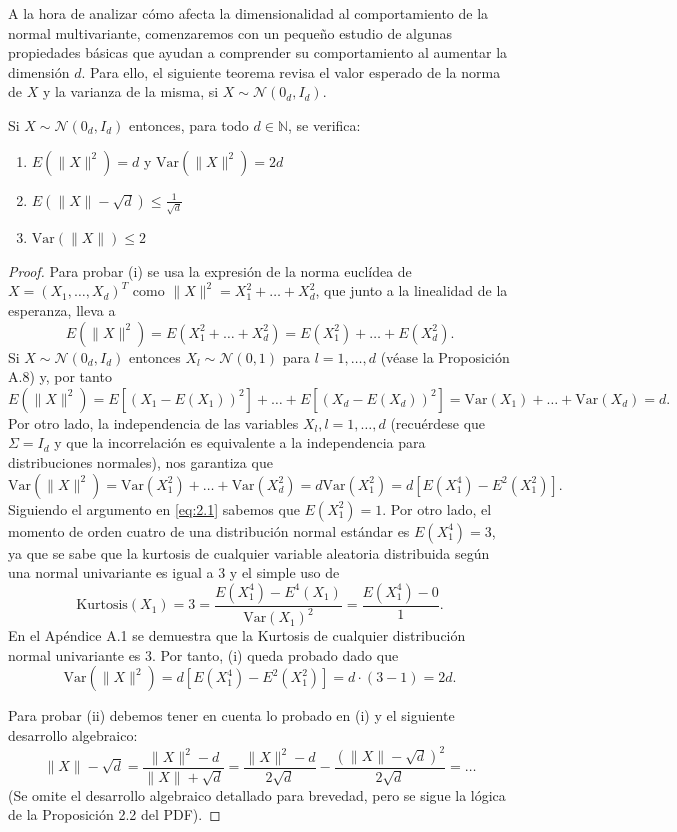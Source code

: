 A la hora de analizar cómo afecta la dimensionalidad al comportamiento de la normal multivariante, comenzaremos con un pequeño estudio de algunas propiedades básicas que ayudan a comprender su comportamiento al aumentar la dimensión $d$. Para ello, el siguiente teorema revisa el valor esperado de la norma de $X$ y la varianza de la misma, si $X \sim \mathcal{N}(0_d, I_d)$.

\begin{proposition}
Si $X \sim \mathcal{N}(0_d, I_d)$ entonces, para todo $d \in \mathbb{N}$, se verifica:
\begin{enumerate}
    \item[(i)] $E(\|X\|^2) = d$ y $\text{Var}(\|X\|^2) = 2d$
    \item[(ii)] $E(\|X\| - \sqrt{d}) \leq \frac{1}{\sqrt{d}}$
    \item[(iii)] $\text{Var}(\|X\|) \leq 2$
\end{enumerate}
\end{proposition}

\begin{proof}
Para probar (i) se usa la expresión de la norma euclídea de $X = (X_1, \dots, X_d)^T$ como $\|X\|^2 = X_1^2 + \dots + X_d^2$, que junto a la linealidad de la esperanza, lleva a
\[ E(\|X\|^2) = E(X_1^2 + \dots + X_d^2) = E(X_1^2) + \dots + E(X_d^2). \]
Si $X \sim \mathcal{N}(0_d, I_d)$ entonces $X_l \sim \mathcal{N}(0, 1)$ para $l = 1, \dots, d$ (véase la Proposición A.8) y, por tanto
\begin{equation}
E(\|X\|^2) = E[(X_1 - E(X_1))^2] + \dots + E[(X_d - E(X_d))^2] = \text{Var}(X_1) + \dots + \text{Var}(X_d) = d.
\label{eq:2.1}
\end{equation}
Por otro lado, la independencia de las variables $X_l, l = 1, \dots, d$ (recuérdese que $\Sigma = I_d$ y que la incorrelación es equivalente a la independencia para distribuciones normales), nos garantiza que
\[ \text{Var}(\|X\|^2) = \text{Var}(X_1^2) + \dots + \text{Var}(X_d^2) = d \text{Var}(X_1^2) = d [E(X_1^4) - E^2(X_1^2)]. \]
Siguiendo el argumento en \eqref{eq:2.1} sabemos que $E(X_1^2) = 1$. Por otro lado, el momento de orden cuatro de una distribución normal estándar es $E(X_1^4) = 3$, ya que se sabe que la kurtosis de cualquier variable aleatoria distribuida según una normal univariante es igual a 3 y el simple uso de
\[ \text{Kurtosis}(X_1) = 3 = \frac{E(X_1^4) - E^4(X_1)}{\text{Var}(X_1)^2} = \frac{E(X_1^4) - 0}{1}. \]
En el Apéndice A.1 se demuestra que la Kurtosis de cualquier distribución normal univariante es 3. Por tanto, (i) queda probado dado que
\begin{equation}
\text{Var}(\|X\|^2) = d [E(X_1^4) - E^2(X_1^2)] = d \cdot (3 - 1) = 2d.
\label{eq:2.2}
\end{equation}

Para probar (ii) debemos tener en cuenta lo probado en (i) y el siguiente desarrollo algebraico:
\[ \|X\| - \sqrt{d} = \frac{\|X\|^2 - d}{\|X\| + \sqrt{d}} = \frac{\|X\|^2 - d}{2\sqrt{d}} - \frac{(\|X\| - \sqrt{d})^2}{2\sqrt{d}} = \dots \]
(Se omite el desarrollo algebraico detallado para brevedad, pero se sigue la lógica de la Proposición 2.2 del PDF).
\end{proof}

